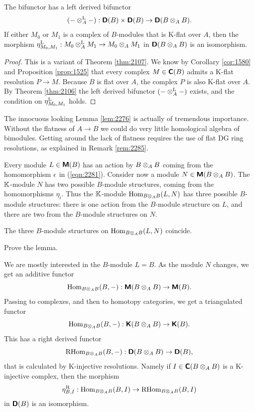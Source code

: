 \begin{lem} \label{lem:2276}
The bifunctor \tup{(\ref{eqn:2276})} has a left derived bifunctor 
\[ (- \otimes^{\mathrm{L}}_A -) 
: \boldsymbol{\mathsf{D}}(B) \times \boldsymbol{\mathsf{D}}(B) \to \boldsymbol{\mathsf{D}}(B \otimes_{A} B) . \]
If either $M_0$ or $M_1$ is a complex of $B$-modules that is K-flat over $A$, 
then the morphism 
$\eta^{\mathrm{L}}_{M_0, M_1} : M_0 \otimes^{\mathrm{L}}_A M_1 \to M_0 \otimes_A M_1$
in $\boldsymbol{\mathsf{D}}(B \otimes_{A} B)$ is an isomorphism. 
\end{lem}

\begin{proof}
This is a variant of Theorem \ref{thm:2107}. 
We know by Corollary \ref{cor:1580} and Proposition \ref{prop:1525} 
that every complex $M \in \boldsymbol{\mathsf{C}}(B)$ admits a K-flat resolution 
$P \to M$. Because $B$ is flat over $A$, the complex $P$ is also K-flat over 
$A$. By Theorem \ref{thm:2106} the left derived bifunctor 
$(- \otimes^{\mathrm{L}}_A -)$ exists, and the condition on 
$\eta^{\mathrm{L}}_{M_0, M_1}$ holds. 
\end{proof}

\begin{rem} \label{rem:2275}
The innocuous looking Lemma \ref{lem:2276} is actually of 
tremendous importance. Without the flatness of $A \to B$ we could do very 
little homological algebra of bimodules. Getting around the lack of flatness 
requires the use of flat DG ring resolutions, as explained in Remark 
\ref{rem:2285}. 
\end{rem}

Every module $L \in \boldsymbol{\mathsf{M}}(B)$ has an action by $B \otimes_{A} B$ coming from the 
homomorphism $\epsilon$ in (\ref{eqn:2281}). Consider now a module 
$N \in \boldsymbol{\mathsf{M}}(B \otimes_{A} B)$.
The $\mathbb{K}$-module $N$ has two possible $B$-module structures, coming from the 
homomorphisms $\eta_i$. Thus the $\mathbb{K}$-module
$\operatorname{Hom}_{B \otimes_{A} B}(L, N)$
has three possible $B$-module structures: there is one action from the 
$B$-module structure on $L$, and there are two from the 
$B$-module structures on $N$. 

\begin{lem} \label{lem:2325}
The three $B$-module structures on $\operatorname{Hom}_{B \otimes_{A} B}(L, N)$ coincide. 
\end{lem}

\begin{exer} \label{exer:2325}
Prove the lemma. 
\end{exer}

We are mostly interested in the $B$-module $L = B$. As the module $N$ changes,
we get an additive functor 
\[ \operatorname{Hom}_{B \otimes_{A} B}(B, -) : \boldsymbol{\mathsf{M}}(B \otimes_{A} B) \to \boldsymbol{\mathsf{M}}(B) . \]
Passing to complexes, and then to homotopy categories, we get a triangulated 
functor 
\[ \operatorname{Hom}_{B \otimes_{A} B}(B, -) : \boldsymbol{\mathsf{K}}(B \otimes_{A} B) \to \boldsymbol{\mathsf{K}}(B) . \]
This has a right derived functor
\begin{equation} \label{eqn:2279}
\operatorname{RHom}_{B \otimes_{A} B}(B, -) :
\boldsymbol{\mathsf{D}}(B \otimes_{A} B) \to \boldsymbol{\mathsf{D}}(B)  , 
\end{equation}
that is calculated by K-injective resolutions. Namely if 
$I \in \boldsymbol{\mathsf{C}}(B \otimes_{A} B)$ is a K-injective complex, then the morphism 
\[ \eta^{\mathrm{R}}_{B, I} : \operatorname{Hom}_{B \otimes_{A} B}(B, I) \to 
\operatorname{RHom}_{B \otimes_{A} B}(B, I) \]
in $\boldsymbol{\mathsf{D}}(B)$ is an isomorphism. 

